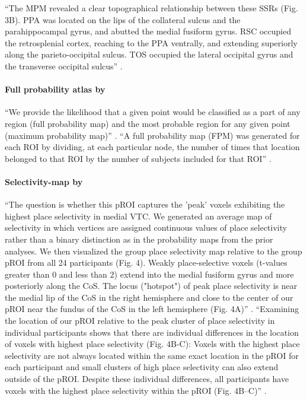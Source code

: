 %
``The MPM revealed a clear topographical relationship between these SSRs (Fig.
3B).
%
PPA was located on the lips of the collateral sulcus and the parahippocampal
gyrus, and abutted the medial fusiform gyrus.
%
RSC occupied the retrosplenial cortex, reaching to the PPA ventrally, and
extending superiorly along the parieto-occipital sulcus.
%
TOS occupied the lateral occipital gyrus and the transverse occipital sulcus''
\citep{zhen2017quantifying}.



\paragraph{Full probability atlas by \citet{wang2015probabilistic}}

%
``We provide the likelihood that a given point would be classified as a part of
any region (full probability map) and the most probable region for any given
point (maximum probability map)'' \citep{wang2015probabilistic}.
%
``A full probability map (FPM) was generated for each ROI by dividing, at each
particular node, the number of times that location belonged to that ROI by the
number of subjects included for that ROI'' \citep{wang2015probabilistic}.



\paragraph{Selectivity-map by \citet{weiner2018defining}}
%
``The question is whether this pROI captures the 'peak' voxels exhibiting the
highest place selectivity in medial VTC.
%
We generated an average map of selectivity in which vertices are assigned
continuous values of place selectivity rather than a binary distinction as in
the probability maps from the prior analyses.
%
We then visualized the group place selectivity map relative to the group pROI
from all 24 participants (Fig. 4).
%
Weakly place-selective voxels (t-values greater than 0 and less than 2) extend
into the medial fusiform gyrus and more posteriorly along the CoS.
%
The locus ("hotspot") of peak place selectivity is near the medial lip of the
CoS in the right hemisphere and close to the center of our pROI near the fundus
of the CoS in the left hemisphere (Fig. 4A)'' \citep{weiner2018defining}.
%
``Examining the location of our pROI relative to the peak cluster of place
selectivity in individual participants shows that there are individual
differences in the location of voxels with highest place selectivity (Fig.
4B-C):
%
Voxels with the highest place selectivity are not always located within the same
exact location in the pROI for each participant and small clusters of high place
selectivity can also extend outside of the pROI.
%
Despite these individual differences, all participants have voxels with the
highest place selectivity within the pROI (Fig. 4B–C)''
\citep{weiner2018defining}.

